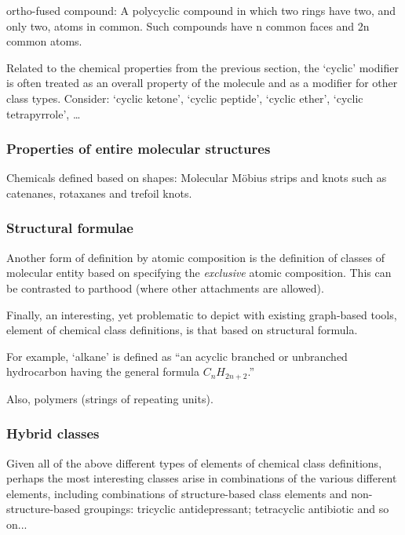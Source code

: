 \documentclass[10pt]{bmc_article}
\newenvironment{bmcformat}{\baselineskip20pt\sloppy\setboolean{publ}{false}}{\baselineskip20pt\sloppy}
\begin{document}
\begin{bmcformat}
ortho-fused compound: A polycyclic compound in which two rings have two, and only two, atoms in common. Such compounds have n common faces and 2n common atoms.

Related to the chemical properties from the previous section, the `cyclic' modifier is often treated as an overall property of the molecule and as a modifier for other class types. Consider: `cyclic ketone', `cyclic peptide', `cyclic ether', `cyclic tetrapyrrole', \ldots


\subsubsection*{Properties of entire molecular structures}

Chemicals defined based on shapes: Molecular M\"{o}bius strips and knots such as catenanes, rotaxanes and trefoil knots. 



\subsubsection*{Structural formulae}
\label{sec:molformula}

Another form of definition by atomic composition is the definition of classes of molecular entity based on specifying the \textit{exclusive} atomic composition.  This can be contrasted to parthood (where other attachments are allowed). 

Finally, an interesting, yet problematic to depict with existing graph-based tools, element of chemical class definitions, is that based on structural formula. 

For example, `alkane' is defined as ``an acyclic branched or unbranched hydrocarbon having the general formula $C_{n}H_{2n+2}$.'' 

Also, polymers (strings of repeating units).


\subsubsection*{Hybrid classes}

Given all of the above different types of elements of chemical class definitions, perhaps the most interesting classes arise in combinations of the various different elements, including combinations of structure-based class elements and non-structure-based groupings:  tricyclic antidepressant; tetracyclic antibiotic and so on...




\end{bmcformat}
\end{document}
